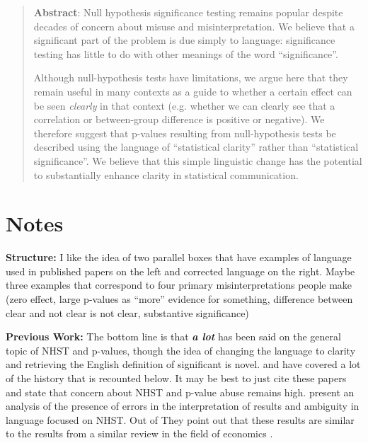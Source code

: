 \begin{abstract}

\textbf{Abstract}: Null hypothesis significance testing remains popular despite decades of concern about misuse and misinterpretation.
We believe that a significant  part of the problem is due simply to language: significance testing has little to do with other meanings of the word ``significance''. 

Although null-hypothesis tests have limitations, we argue here that they remain useful in many contexts as a guide to whether a certain effect can be seen \emph{clearly} in that context (e.g.
whether we can clearly see that a correlation or between-group difference is positive or negative).
We therefore suggest that p-values resulting from null-hypothesis tests be described using the language of ``statistical clarity'' rather than ``statistical significance''.
We believe that this simple linguistic change has the potential to substantially enhance clarity in statistical communication.

\end{abstract}

\flushbottom
\maketitle
\newpage
\thispagestyle{empty}

\section*{Notes}

\textbf{Structure:} I like the idea of two parallel boxes that have examples of language used in published papers on the
left and corrected language on the right.
Maybe three examples that correspond to four primary misinterpretations people
make (zero effect, large p-values as ``more'' evidence for something, difference between clear and not clear is not clear,
substantive significance)

\textbf{Previous Work:} The bottom line is that \emph{\textbf{a lot}} has been said on the general topic of NHST and 
p-values, though the idea of changing the language to clarity and retrieving the English definition of significant
is novel.
\citet{Bernardietal.2017} and \citet{McShaneetal.2017} have covered a lot of the history that is
recounted below.
It may be best to just cite these papers and state that concern about NHST and p-value abuse 
remains high.
\citep{Bernardietal.2017} present an analysis of the presence of errors in the interpretation of 
results and ambiguity in language focused on NHST. Out of  They point out that these results are similar to the
results from a similar review in the field of economics \citep{ZiliakandMcCloskey2008}.

